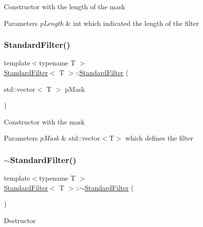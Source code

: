 Constructor with the length of the mask 
\begin{DoxyParams}{Parameters}
{\em p\+Length} & int which indicated the length of the filter \\
\hline
\end{DoxyParams}
\mbox{\label{class_standard_filter_a380828493a181b61010bb633538b0e7c}} 
\subsubsection{\texorpdfstring{Standard\+Filter()}{StandardFilter()}\hspace{0.1cm}{\footnotesize\ttfamily [3/3]}}
{\footnotesize\ttfamily template$<$typename T $>$ \\
\hyperlink{class_standard_filter}{Standard\+Filter}$<$ T $>$\+::\hyperlink{class_standard_filter}{Standard\+Filter} (\begin{DoxyParamCaption}\item[{std\+::vector$<$ T $>$}]{p\+Mask }\end{DoxyParamCaption})}

Constructor with the mask 
\begin{DoxyParams}{Parameters}
{\em p\+Mask} & std\+::vector$<$\+T$>$ which defines the filter \\
\hline
\end{DoxyParams}
\mbox{\label{class_standard_filter_a748eb93b291c9f50496015f3c07069a0}} 
\subsubsection{\texorpdfstring{$\sim$\+Standard\+Filter()}{~StandardFilter()}}
{\footnotesize\ttfamily template$<$typename T $>$ \\
\hyperlink{class_standard_filter}{Standard\+Filter}$<$ T $>$\+::$\sim$\hyperlink{class_standard_filter}{Standard\+Filter} (\begin{DoxyParamCaption}{ }\end{DoxyParamCaption})}

Destructor 

